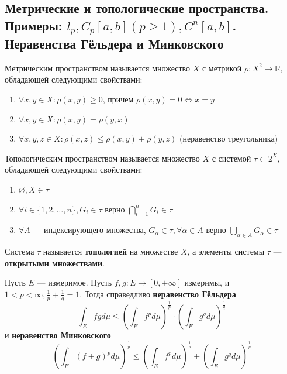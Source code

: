 
\subsection{Метрические и топологические пространства. Примеры: $l_p, C_p[a, b] (p \geqslant 1), C^n[a, b]$. Неравенства Гёльдера и Минковского}

\begin{definition}
	Метрическим пространством называется множество $X$ с метрикой $\rho: X^2 \to \mathbb{R}$, обладающей следующими свойствами:
	\begin{enumerate}
		\item $\forall x, y \in X : \rho(x, y) \geqslant 0$, причем $\rho(x, y) = 0 \Leftrightarrow x = y$
		\item $\forall x, y \in X : \rho(x, y) = \rho(y, x)$
		\item $\forall x, y, z \in X : \rho(x, z) \leqslant \rho(x, y) + \rho(y, z)$ (неравенство треугольника)
	\end{enumerate}
\end{definition}

\begin{definition}
	Топологическим пространством называется множество $X$ с системой $\tau \subset 2^X$, обладающей следующими свойствами:
	\begin{enumerate}
		\item $\varnothing, X \in \tau$
		\item $\forall i \in \{1, 2, \dots, n\}, G_i \in \tau$ верно $\bigcap_{i=1}^n G_i \in \tau$
		\item $\forall A$ — индексирующего множества, $G_{\alpha} \in \tau, \forall \alpha \in A$ верно $\bigcup_{\alpha \in A} G_{\alpha} \in \tau$
	\end{enumerate}
	Система $\tau$ называется \textbf{топологией} на множестве $X$, а элементы системы $\tau$ — \textbf{открытыми множествами}.
\end{definition}

\begin{theorem}
	Пусть $E$ — измеримое. Пусть $f, g : E \to [0, +\infty]$ измеримы, и $1 < p < \infty, \frac{1}{p} + \frac{1}{q} = 1$. Тогда справедливо \textbf{неравенство Гёльдера}
	\[ \int_E fg d\mu \leqslant \left( \int_E f^p d\mu \right)^{\frac{1}{p}} \cdot \left( \int_E g^q d\mu \right)^{\frac{1}{q}} \]
	и \textbf{неравенство Минковского}
	\[ \left( \int_E (f + g)^p d\mu \right)^{\frac{1}{p}} \leqslant \left( \int_E f^p d\mu \right)^{\frac{1}{p}} + \left( \int_E g^q d\mu \right)^{\frac{1}{p}} \]
\end{theorem}

